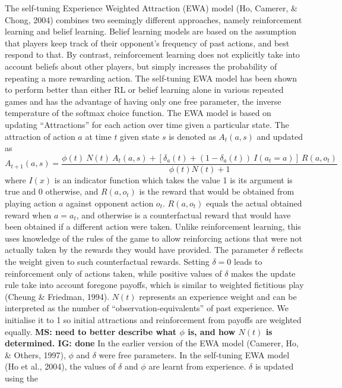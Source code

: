 \documentclass[man,floatsintext]{apa6}
\begin{document}
The self-tuning Experience Weighted Attraction (EWA) model (Ho, Camerer, \& Chong, 2004) combines two seemingly different approaches, namely reinforcement learning and belief learning. Belief learning models are based on the assumption that players keep track of their opponent's frequency of past actions, and best respond to that. By contrast, reinforcement learning does not explicitly take into account beliefs about other players, but simply increases the probability of repeating a more rewarding action. The self-tuning EWA model has been shown to perform better than either RL or belief learning alone in various repeated games and has the advantage of having only one free parameter, the inverse temperature of the softmax choice function. The EWA model is based on updating ``Attractions'' for each action over time given a particular state. The attraction of action \(a\) at time \(t\) given state \(s\) is denoted as \(A_{t}(a, s)\) and updated as
\[ A_{t+1}(a,s) =  \frac{\phi(t) \ N(t) \ A_{t}(a,s) + [ \delta_{a}(t) + (1-\delta_{a}(t)) \ I(a_t = a )] \ R(a,o_t) } {\phi(t)N(t) + 1} \]
where \(I(x)\) is an indicator function which takes the value 1 is its argument is true and 0 otherwise, and \(R(a,o_t)\) is the reward that would be obtained from playing action \(a\) against opponent action \(o_t\). \(R(a,o_t)\) equals the actual obtained reward when \(a = a_t\), and otherwise is a counterfactual reward that would have been obtained if a different action were taken. Unlike reinforcement learning, this uses knowledge of the rules of the game to allow reinforcing actions that were not actually taken by the rewards they would have provided. The parameter \(\delta\) reflects the weight given to such counterfactual rewards. Setting \(\delta = 0\) leads to reinforcement only of actions taken, while positive values of \(\delta\) makes the update rule take into account foregone payoffs, which is similar to weighted fictitious play (Cheung \& Friedman, 1994). \(N(t)\) represents an experience weight and can be interpreted as the number of \enquote{observation-equivalents} of past experience. We initialise it to 1 so initial attractions and reinforcement from payoffs are weighted equally. \textbf{MS: need to better describe what \(\phi\) is, and how \(N(t)\) is determined. IG: done} In the earlier version of the EWA model (Camerer, Ho, \& Others, 1997), \(\phi\) and \(\delta\) were free parameters. In the self-tuning EWA model (Ho et al., 2004), the values of \(\delta\) and \(\phi\) are learnt from experience. \(\delta\) is updated using the
\end{document}
